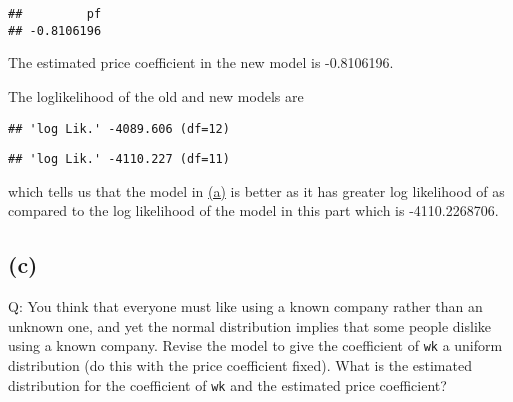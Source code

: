\documentclass[
]{article}
\newenvironment{Shaded}{\begin{snugshade}}{\end{snugshade}}
\newcommand{\DecValTok}[1]{\textcolor[rgb]{0.00,0.00,0.81}{#1}}
\newcommand{\NormalTok}[1]{#1}
\newcommand{\OperatorTok}[1]{\textcolor[rgb]{0.81,0.36,0.00}{\textbf{#1}}}
\newcommand{\StringTok}[1]{\textcolor[rgb]{0.31,0.60,0.02}{#1}}
\begin{document}
\begin{Shaded}
\end{Shaded}

\begin{verbatim}
##         pf 
## -0.8106196
\end{verbatim}

The estimated price coefficient in the new model is -0.8106196.

The loglikelihood of the old and new models are

\begin{Shaded}
\end{Shaded}

\begin{verbatim}
## 'log Lik.' -4089.606 (df=12)
\end{verbatim}

\begin{Shaded}
\end{Shaded}

\begin{verbatim}
## 'log Lik.' -4110.227 (df=11)
\end{verbatim}

which tells us that the model in \protect\hyperlink{twoa}{(a)} is better
as it has greater log likelihood of  as compared
to the log likelihood of the model in this part which is -4110.2268706.

\hypertarget{c}{%
\subsection{(c)}\label{c}}

Q: You think that everyone must like using a known company rather than
an unknown one, and yet the normal distribution implies that some people
dislike using a known company. Revise the model to give the coefficient
of \texttt{wk} a uniform distribution (do this with the price
coefficient fixed). What is the estimated distribution for the
coefficient of \texttt{wk} and the estimated price coefficient?
\end{document}
